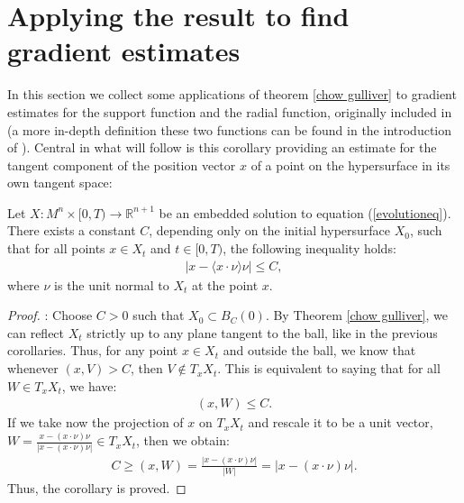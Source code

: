 \section{Applying the result to find gradient estimates}\label{Applying the result to find gradient estimates}

In this section we collect some applications of theorem \ref{chow gulliver} to gradient estimates for the support function and the radial function, originally included in \cite{Chow} (a more in-depth definition these two functions can be found in the introduction of \cite{tomography}). Central in what will follow is this corollary providing an estimate for the tangent component of the position vector $x$ of a point on the hypersurface in its own tangent space: 
\begin{cor}
	Let $ X : M^n \times [0, T) \to \mathbb{R}^{n+1} $ be an embedded solution to equation (\ref{evolutioneq}). There exists a constant $ C $, depending only on the initial hypersurface $ X_0 $, such that for all points $ x \in X_t $ and $ t \in [0, T) $, the following inequality holds:
	\begin{align*}
		| x - \langle x \cdot \nu\rangle \nu | \leq C,
	\end{align*}
	where $ \nu $ is the unit normal to $ X_t $ at the point $ x $.
	\label{x projection estimate}
\end{cor}


\begin{proof}: 
	Choose $ C > 0 $ such that $ X_0 \subset B_C(0) $. By Theorem \ref{chow gulliver}, we can reflect $ X_t $ strictly up to any plane tangent to the ball, like in the previous corollaries.	
	Thus, for any point $ x \in X_t $ and outside the ball, we know that whenever $ (x, V) > C $, then $ V \notin T_x X_t $.
	This is equivalent to saying that for all $ W \in T_x X_t $, we have:
	\begin{align*}
		(x, W) \leq C.
	\end{align*}
	If we take now the projection of $x$ on $T_x X_t$ and rescale it to be a unit vector, $ W = \frac{x - (x \cdot \nu) \nu}{|x - (x \cdot \nu) \nu|} \in T_x X_t $, then we obtain:
	\begin{align*}
		C \geq (x, W) = \frac{|x - (x \cdot \nu) \nu|}{|W|} = |x - (x \cdot \nu) \nu|.
	\end{align*}	
	Thus, the corollary is proved.
\end{proof}


